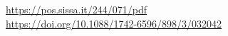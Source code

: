 \documentclass[../main.tex]{subfiles}
\begin{document}
    \url{https://pos.sissa.it/244/071/pdf}\\
    \url{https://doi.org/10.1088/1742-6596/898/3/032042} 
\end{document}
